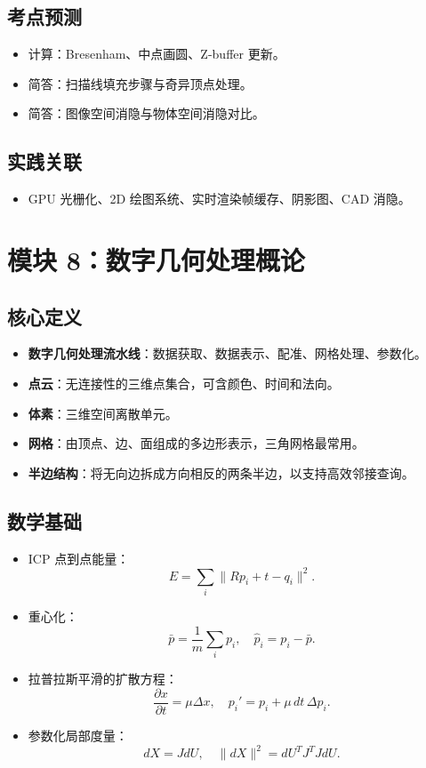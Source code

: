 \documentclass[UTF8,zihao=-4,scheme=chinese,fontset=fandol]{ctexart}
\newcommand{\key}[1]{\textbf{#1}}
\begin{document}
\subsection{考点预测}
\begin{itemize}
  \item 计算：Bresenham、中点画圆、Z-buffer 更新。
  \item 简答：扫描线填充步骤与奇异顶点处理。
  \item 简答：图像空间消隐与物体空间消隐对比。
\end{itemize}

\subsection{实践关联}
\begin{itemize}
  \item GPU 光栅化、2D 绘图系统、实时渲染帧缓存、阴影图、CAD 消隐。
\end{itemize}

\section{模块 8：数字几何处理概论}

\subsection{核心定义}
\begin{itemize}
  \item \key{数字几何处理流水线}：数据获取、数据表示、配准、网格处理、参数化。
  \item \key{点云}：无连接性的三维点集合，可含颜色、时间和法向。
  \item \key{体素}：三维空间离散单元。
  \item \key{网格}：由顶点、边、面组成的多边形表示，三角网格最常用。
  \item \key{半边结构}：将无向边拆成方向相反的两条半边，以支持高效邻接查询。
\end{itemize}

\subsection{数学基础}
\begin{itemize}
  \item ICP 点到点能量：
  \[
  E=\sum_i\|Rp_i+t-q_i\|^2.
  \]
  \item 重心化：
  \[
  \bar p=\frac1m\sum_i p_i,\quad \hat p_i=p_i-\bar p.
  \]
  \item 拉普拉斯平滑的扩散方程：
  \[
  \frac{\partial x}{\partial t}=\mu\Delta x,\quad
  p_i'=p_i+\mu\,dt\,\Delta p_i.
  \]
  \item 参数化局部度量：
  \[
  dX=JdU,\quad \|dX\|^2=dU^TJ^TJdU.
  \]
\end{itemize}
\end{document}
